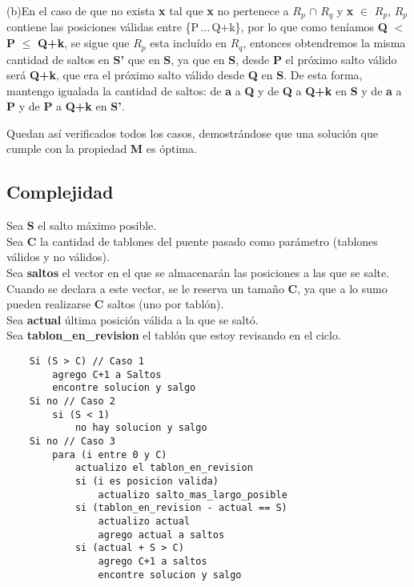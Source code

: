 (b)En el caso de que no exista \textbf{x} tal que \textbf{x} no pertenece a $R_{p}$ $\cap$ $R_{q}$ y \textbf{x} $\in$ $R_{p}$, $R_{p}$ contiene las posiciones válidas entre \{P\,...\,Q+k\}, por lo que como teníamos \textbf{Q} $<$ \textbf{P} $\leq$ \textbf{Q+k}, se sigue que $R_{p}$ esta incluído en $R_{q}$, entonces obtendremos la misma cantidad de saltos en \textbf{S'} que en \textbf{S}, ya que en \textbf{S}, desde \textbf{P} el próximo salto válido será \textbf{Q+k}, que era el próximo salto válido desde \textbf{Q} en \textbf{S}. De esta forma, mantengo igualada la cantidad de saltos: de \textbf{a} a \textbf{Q} y de \textbf{Q} a \textbf{Q+k} en \textbf{S} y de \textbf{a} a \textbf{P} y de \textbf{P} a \textbf{Q+k} en \textbf{S'}.

Quedan así verificados todos los casos, demostrándose que una solución que cumple con la propiedad \textbf{M} es óptima.\newpage




\subsection{Complejidad}
\noindent Sea \textbf{S} el salto m\'aximo posible.\\
Sea \textbf{C} la cantidad de tablones del puente pasado como par\'ametro (tablones v\'alidos y no v\'alidos).\\
Sea \textbf{saltos} el vector en el que se almacenar\'an las posiciones a las que se salte. Cuando se declara a este vector, se le reserva un tama\~no \textbf{C}, ya que a lo sumo pueden realizarse \textbf{C} saltos (uno por tabl\'on).\\
Sea \textbf{actual} última posición válida a la que se saltó.\\
Sea \textbf{tablon\_en\_revision} el tabl\'on que estoy revisando en el ciclo.\\

\begin{lstlisting}
	Si (S > C) // Caso 1
		agrego C+1 a Saltos
		encontre solucion y salgo
	Si no // Caso 2
		si (S < 1)	
			no hay solucion y salgo
	Si no // Caso 3
		para (i entre 0 y C)
			actualizo el tablon_en_revision
			si (i es posicion valida)
				actualizo salto_mas_largo_posible
			si (tablon_en_revision - actual == S)
				actualizo actual
				agrego actual a saltos
			si (actual + S > C)
				agrego C+1 a saltos
				encontre solucion y salgo

\end{lstlisting}

